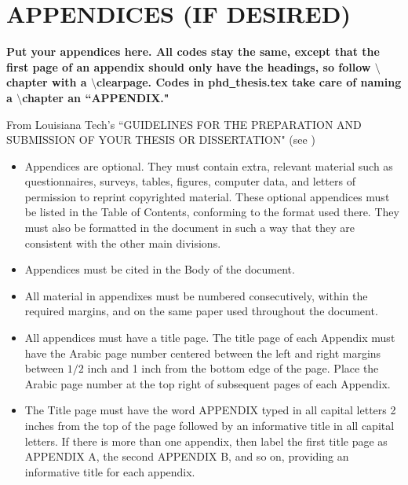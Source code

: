 
\chapter{APPENDICES (IF DESIRED)}\label{append1}

\clearpage


{\bf Put your appendices here. All codes stay the same, except that 
the first page of an appendix should only have the 
headings, so follow $\setminus $chapter with a 
$\setminus $clearpage. Codes in phd\underline{~}thesis.tex
take care of naming a $\setminus $chapter an ``APPENDIX."}

From Louisiana Tech's
``GUIDELINES FOR THE
PREPARATION AND SUBMISSION
OF YOUR THESIS OR DISSERTATION"
(see \cite{guide})



\begin{itemize}
\item
Appendices are optional. They must contain extra, relevant material such as
questionnaires, surveys, tables, figures, computer data, and letters of permission
to reprint copyrighted material. These optional appendices must be listed in the
Table of Contents, conforming to the format used there. They must also be
formatted in the document in such a way that they are consistent with the other
main divisions.
\item
Appendices must be cited in the Body of the document.
\item
All material in appendixes must be numbered consecutively, within the required
margins, and on the same paper used throughout the document.
\item
All appendices must have a title page. The title page of each Appendix must have
the Arabic page number centered between the left and right margins between $1/2$
inch and 1 inch from the bottom edge of the page. Place the Arabic page number
at the top right of subsequent pages of each Appendix.
\item
The Title page must have the word APPENDIX typed in all capital letters 2
inches from the top of the page followed by an informative title in all capital
letters. If there is more than one appendix, then label the first title page as
APPENDIX A, the second APPENDIX B, and so on, providing an
informative title for each appendix.
\end{itemize}